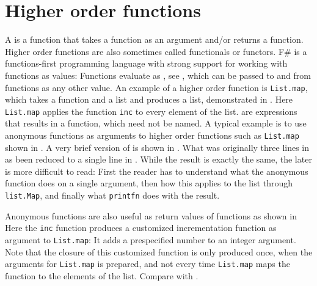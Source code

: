 \chapter{Higher order functions}
\label{chap:higherOrderFunctions}
A  is a function that takes a function as an argument and/or returns a function. Higher order functions are also sometimes called functionals or functors. F\# is a functions-first programming language with strong support for working with functions as values: Functions evaluate as , see , which can be passed to and from functions as any other value. An example of a higher order function is \lstinline{List.map}, which takes a function and a list and produces a list, demonstrated in .
%
%
Here \lstinline{List.map} applies the function \lstinline{inc} to every element of the list.  are expressions that results in a function, which need not be named. A typical example is to use anonymous functions as arguments to higher order functions such as \lstinline{List.map} shown in .
%
%
A very brief version of  is shown in .
%
%
What was originally three lines in  as been reduced to a single line in . While the result is exactly the same, the later is more difficult to read: First the reader has to understand what the anonymous function does on a single argument, then how this applies to the list through \lstinline{list.Map}, and finally what \lstinline{printfn} does with the result.

Anonymous functions are also useful as return values of functions as shown in 
%
%
Here the \lstinline{inc} function produces a customized incrementation function as argument to \lstinline{List.map}: It adds a prespecified number to an integer argument. Note that the closure of this customized function is only produced once, when the arguments for \lstinline{List.map} is prepared, and not every time \lstinline{List.map} maps the function to the elements of the list. Compare with .

